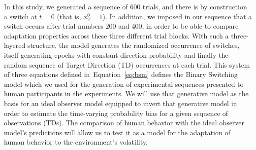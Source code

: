 \documentclass[10pt,letterpaper]{article}
\newcommand{\seeFig}[1]{Figure~\ref{fig:#1}}
\newcommand{\seeEq}[1]{Equation~\ref{eq:#1}}
\begin{document}
In this study, we generated a sequence of $600$ trials,
and there is by construction a switch at $t=0$ (that is, $x_2^0=1$).
In addition, we imposed in our sequence that a switch
occurs after trial numbers $200$ and $400$,
in order to be able to compare adaptation properties
across these three different trial blocks.
With such a three-layered structure, the model generates the randomized occurrence of switches,
itself generating epochs with constant direction probability %
and finally the random sequence of Target Direction (TD) occurrences at each trial.
This system of three equations defined in~\seeEq{bsm}
defines the Binary Switching model
which we used for the generation of experimental sequences presented to human participants in the experiments.
We will use that generative model as the basis for an ideal observer model equipped to
invert that generative model in order to estimate the time-varying probability bias for a given sequence of observations (TDs).
The comparison of human behavior with the ideal observer model's predictions will allow us to test it as a model for the adaptation of human behavior to the environment's volatility.
\end{document}
